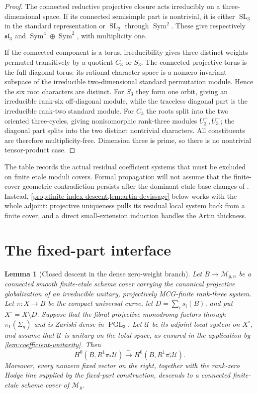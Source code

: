 \documentclass[11pt]{article}
\newtheorem{lemma}[theorem]{Lemma}
\theoremstyle{definition}
\newcommand{\Mcal}{\mathcal M}
\newcommand{\Ucal}{\mathcal U}
\newcommand{\SL}{\operatorname{SL}}
\newcommand{\PGL}{\operatorname{PGL}}
\begin{document}
\begin{proof}
The connected reductive projective closure acts irreducibly on a
three-dimensional space.  If its connected semisimple part is nontrivial, it
is either $\SL_3$ in the standard representation or $\SL_2$ through
$\operatorname{Sym}^2$.  These give respectively $\mathfrak{sl}_3$ and
$\operatorname{Sym}^4\oplus\operatorname{Sym}^2$, with multiplicity one.

If the connected component is a torus, irreducibility gives three distinct
weights permuted transitively by a quotient $C_3$ or $S_3$.  The connected
projective torus is the full diagonal torus: its rational character space is a
nonzero invariant subspace of the irreducible two-dimensional standard
permutation module.  Hence the six root characters are distinct.  For $S_3$
they form one orbit, giving an irreducible rank-six off-diagonal module, while
the traceless diagonal part is the irreducible rank-two standard module.  For
$C_3$ the roots split into the two oriented three-cycles, giving nonisomorphic
rank-three modules $U_3^+,U_3^-$; the diagonal part splits into the two
distinct nontrivial characters.  All constituents are therefore
multiplicity-free.  Dimension three is prime, so there is no nontrivial
tensor-product case.
\end{proof}

The table records the actual residual coefficient systems that must be
excluded on finite etale moduli covers.  Formal propagation will not assume
that the finite-cover geometric contradiction persists after the dominant
etale base changes of \cite[Lemma 2.4.2]{LLCan}.  Instead,
\cref{prop:finite-index-descent,lem:artin-devissage} below works with the
whole adjoint: projective uniqueness pulls its residual local system back
from a finite cover, and a direct small-extension induction handles the
Artin thickness.

\section{The fixed-part interface}\label{sec:fixedpart}

\begin{lemma}[Closed descent in the dense zero-weight branch]
\label{lem:zero-weight-closed-descent}
Let $B\to\Mcal_{g,n}$ be a connected smooth finite-etale scheme cover
carrying the canonical projective globalization of an irreducible unitary,
projectively MCG-finite rank-three system.  Let $\pi:X\to B$ be the compact
universal curve, let $D=\sum_i s_i(B)$, and put $X^\circ=X\setminus D$.
Suppose that the fibral
projective monodromy factors through $\pi_1(\Sigma_g)$ and is Zariski dense in
$\PGL_3$.  Let $\Ucal$ be its adjoint local system on $X^\circ$, and assume
that $\Ucal$ is unitary on the total space, as ensured in the application by
\cref{lem:coefficient-unitarity}.  Then
\[
 H^0\!\left(B,R^1\pi_*\Ucal\right)
 \xrightarrow{\ \sim\ }
 H^0\!\left(B,R^1\pi_*^\circ\Ucal\right).
\]
Moreover, every nonzero fixed vector on the right, together with the
rank-zero Hodge line supplied by the fixed-part construction, descends to a
connected finite-etale scheme cover of $\Mcal_g$.
\end{lemma}
\end{document}
